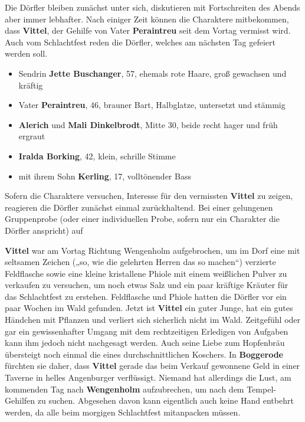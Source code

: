 Die Dörfler bleiben zunächst unter sich, diskutieren mit Fortschreiten des Abends aber immer lebhafter.
Nach einiger Zeit können die Charaktere mitbekommen, dass \textbf{Vittel}, der Gehilfe von Vater \textbf{Peraintreu} seit dem Vortag vermisst wird.
Auch vom Schlachtfest reden die Dörfler, welches am nächsten Tag gefeiert werden soll.

\begin{itemize}
	\item Sendrin \textbf{Jette Buschanger}, 57, ehemals rote Haare, groß gewachsen und kräftig
	\item Vater \textbf{Peraintreu}, 46, brauner Bart, Halbglatze, untersetzt und stämmig
	\item \textbf{Alerich} und \textbf{Mali Dinkelbrodt}, Mitte 30, beide recht hager und früh ergraut
	\item \textbf{Iralda Borking}, 42, klein, schrille Stimme
	\item mit ihrem Sohn \textbf{Kerling}, 17, volltönender Bass
\end{itemize}

Sofern die Charaktere versuchen, Interesse für den vermissten \textbf{Vittel} zu zeigen, reagieren die Dörfler zunächst einmal zurückhaltend.
Bei einer gelungenen Gruppenprobe (oder einer individuellen Probe, sofern nur ein Charakter die Dörfler anspricht) auf 

\textbf{Vittel} war am Vortag Richtung Wengenholm aufgebrochen, um im Dorf eine mit seltsamen Zeichen („so, wie die gelehrten Herren das so machen“) verzierte Feldflasche sowie eine kleine kristallene Phiole mit einem weißlichen Pulver zu verkaufen zu versuchen, um noch etwas Salz und ein paar kräftige Kräuter für das Schlachtfest zu erstehen.
Feldflasche und Phiole hatten die Dörfler vor ein paar Wochen im Wald gefunden.
Jetzt ist \textbf{Vittel} ein guter Junge, hat ein gutes Händchen mit Pflanzen und verliert sich sicherlich nicht im Wald.
Zeitgefühl oder gar ein gewissenhafter Umgang mit dem rechtzeitigen Erledigen von Aufgaben kann ihm jedoch nicht nachgesagt werden. 
Auch seine Liebe zum Hopfenbräu übersteigt noch einmal die eines durchschnittlichen Koschers.
In \textbf{Boggerode} fürchten sie daher, dass \textbf{Vittel} gerade das beim Verkauf gewonnene Geld in einer Taverne in helles Angenburger verflüssigt.
Niemand hat allerdings die Lust, am kommenden Tag nach \textbf{Wengenholm} aufzubrechen, um nach dem Tempel-Gehilfen zu suchen.
Abgesehen davon kann eigentlich auch keine Hand entbehrt werden, da alle beim morgigen Schlachtfest mitanpacken müssen.

